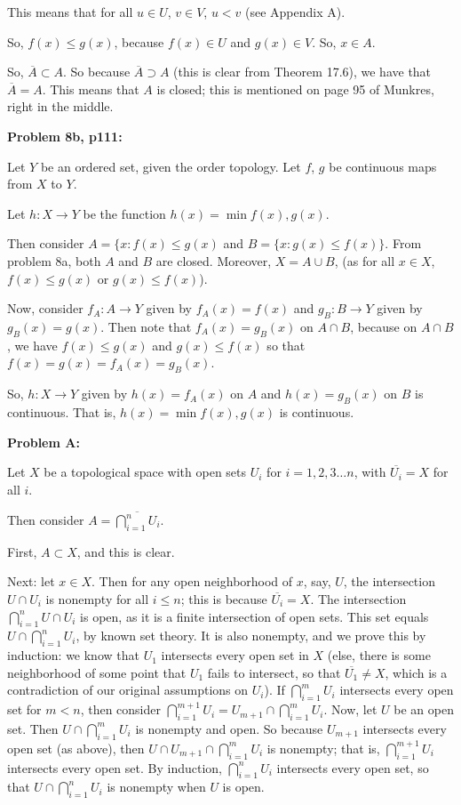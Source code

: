 \documentclass[a4paper,12pt]{article}
\begin{document}
This means that for all $u \in U$, $v \in V$, $u < v$ (see Appendix A).

So, $f(x) \leq g(x)$, because $f(x) \in U$ and $g(x) \in V$. So, $x \in A$.

So, $\overline{A} \subset A$. So because $\overline{A} \supset A$ (this is clear from Theorem 17.6), we have that $\overline{A} = A$. This means that $A$ is closed; this is mentioned on page 95 of Munkres, right in the middle.

\shunt

{\bf Problem 8b, p111:}

Let $Y$ be an ordered set, given the order topology. Let $f$, $g$ be continuous maps from $X$ to $Y$.

Let $h: X \to Y$ be the function $h(x) = \min{f(x),g(x)}$.

Then consider $A = \{x: f(x) \leq g(x)$ and $B = \{x: g(x) \leq f(x)\}$. From problem 8a, both $A$ and $B$ are closed. Moreover, $X = A \cup B$, (as for all $x \in X$, $f(x) \leq g(x)$ or $g(x) \leq f(x)$).

Now, consider $f_A: A \to Y$ given by $f_A(x) = f(x)$ and $g_B: B \to Y$ given by $g_B(x) = g(x)$. Then note that $f_A(x) = g_B(x)$ on $A \cap B$, because on $A \cap B$, we have $f(x) \leq g(x)$ and $g(x) \leq f(x)$ so that $f(x) = g(x)=f_A(x) = g_B(x)$.

So, $h: X \to Y$ given by $h(x) = f_A(x)$ on $A$ and $h(x) = g_B(x)$ on $B$ is continuous. That is, $h(x) = \min{f(x),g(x)}$ is continuous.

\shunt

{\bf Problem A:}

Let $X$ be a topological space with open sets $U_i$ for $i=1,2,3 \ldots n$, with $\overline{U_i} = X$ for all $i$.

Then consider $A = \overline{\bigcap\limits_{i=1}^n U_i}$. 

First, $A \subset X$, and this is clear.

Next: let $x \in X$. Then for any open neighborhood of $x$, say, $U$, the intersection $U \cap U_i$ is nonempty for all $i \leq n$; this is because $\overline{U_i} = X$. The intersection $\bigcap\limits_{i=1}^n U \cap U_i$ is open, as it is a finite intersection of open sets. This set equals $U \cap \bigcap\limits_{i=1}^n U_i$, by known set theory. It is also nonempty, and we prove this by induction: we know that $U_1$ intersects every open set in $X$ (else, there is some neighborhood of some point that $U_1$ fails to intersect, so that $\overline{U_1} \neq X$, which is a contradiction of our original assumptions on $U_i$). If $\bigcap\limits_{i=1}^m U_i$ intersects every open set for $m < n$, then consider $\bigcap\limits_{i=1}^{m+1} U_i = U_{m+1} \cap \bigcap\limits_{i=1}^m U_i$. Now, let $U$ be an open set. Then $U \cap \bigcap\limits_{i=1}^m U_i$ is nonempty and open. So because $U_{m+1}$ intersects every open set (as above), then $U\cap U_{m+1} \cap \bigcap\limits_{i=1}^m U_i$ is nonempty; that is, $\bigcap\limits_{i=1}^{m+1} U_i$ intersects every open set. By induction, $\bigcap\limits_{i=1}^{n} U_i$ intersects every open set, so that $U \cap \bigcap\limits_{i=1}^{n} U_i$ is nonempty when $U$ is open.
\end{document}

